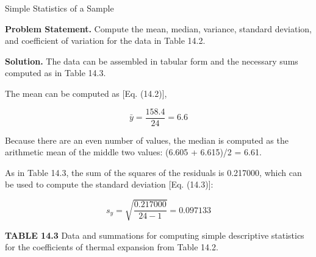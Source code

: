 \documentclass[../main.tex]{subfiles}
\begin{document}
\begin{example} Simple Statistics of a Sample
	
	\noindent \textbf{Problem Statement.} \quad Compute the mean, median, variance, standard deviation, and coefficient of variation for the data in Table 14.2.

	\noindent \textbf{Solution.} \quad   The data can be assembled in tabular form and the necessary sums computed
	as in Table 14.3.

	The mean can be computed as [Eq. (14.2)],

	$$
		\bar{y} = \frac{158.4}{24} = 6.6
	$$

	\noindent Because there are an even number of values, the median is computed as the arithmetic
	mean of the middle two values: (6.605 + 6.615)/2 = 6.61.

	As in Table 14.3, the sum of the squares of the residuals is 0.217000, which can be
used to compute the standard deviation [Eq. (14.3)]:

	$$
		s_y = \sqrt{\frac{0.217000}{24 - 1}}  = 0.097133
	$$

	\noindent \textbf{TABLE 14.3} \quad Data and summations for computing simple descriptive statistics for the
	coefficients of thermal expansion from Table 14.2.


\end{example}
\end{document}
